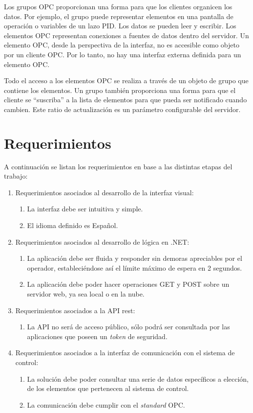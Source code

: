 Los grupos OPC proporcionan una forma para que los clientes organicen los datos. Por ejemplo, el grupo puede representar elementos en una pantalla de operación o variables de un lazo PID. Los datos se pueden leer y escribir. Los elementos OPC representan conexiones a fuentes de datos dentro del servidor. Un elemento OPC, desde la perspectiva de la interfaz, no es accesible como objeto por un cliente OPC. Por lo tanto, no hay una interfaz externa definida para un elemento OPC. 

Todo el acceso a los elementos OPC se realiza a través de un objeto de grupo que contiene los elementos. Un grupo también proporciona una forma para que el cliente se ``suscriba'' a la lista de elementos para que pueda ser notificado cuando cambien. Este ratio de actualización es un parámetro configurable del servidor.


\section{Requerimientos}

A continuación se listan los requerimientos en base a las distintas etapas del trabajo:

\begin{enumerate}
\item Requerimientos asociados al desarrollo de la interfaz visual:
	\begin{enumerate}
	\item La interfaz debe ser intuitiva y simple.
	\item El idioma definido es Español.
	\end{enumerate}
\item Requerimientos asociados al desarrollo de lógica en .NET:
	\begin{enumerate}
	\item La aplicación debe ser fluida y responder sin demoras apreciables por el operador, estableciéndose así el límite máximo de espera en 2 segundos.
	\item La aplicación debe poder hacer operaciones GET y POST sobre un servidor web, ya sea local o en la nube.
	\end{enumerate}
\item Requerimientos asociados a la API rest:
	\begin{enumerate}
	\item La API no será de acceso público, sólo podrá ser consultada por las aplicaciones que poseen un \textit{token} de seguridad.
	\end{enumerate}
\item Requerimientos asociados a la interfaz de comunicación con el sistema de control:	
	\begin{enumerate}	
	\item La solución debe poder consultar una serie de datos específicos a elección, de los elementos que pertenecen al sistema de control.
	\item La comunicación debe cumplir con el \textit{standard} OPC.
	\end{enumerate}
\end{enumerate}

